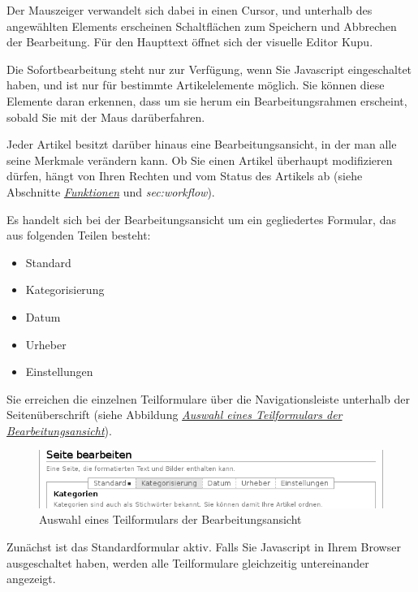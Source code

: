 \documentclass[a4paper,12pt,ngerman]{manual}
\begin{document}
Der Mauszeiger verwandelt sich dabei in einen Cursor, und unterhalb des
angewählten Elements erscheinen Schaltflächen zum Speichern und Abbrechen der
Bearbeitung. Für den Haupttext öffnet sich der visuelle Editor Kupu.

Die Sofortbearbeitung steht nur zur Verfügung, wenn Sie Javascript
eingeschaltet haben, und ist nur für bestimmte
Artikelelemente möglich. Sie können diese Elemente daran erkennen, dass um sie
herum ein Bearbeitungsrahmen erscheint, sobald Sie mit der Maus darüberfahren.

Jeder Artikel besitzt darüber hinaus eine Bearbeitungsansicht, in der man alle
seine Merkmale verändern kann. Ob Sie einen Artikel überhaupt modifizieren
dürfen, hängt von Ihren Rechten und vom Status des Artikels ab (siehe
Abschnitte \hyperlink{sec-benutzer-rollen}{\emph{Funktionen}} und \emph{sec:workflow}).

Es handelt sich bei der Bearbeitungsansicht um ein gegliedertes
Formular, das aus folgenden Teilen besteht:
\begin{itemize}
\item {} 
Standard

\item {} 
Kategorisierung

\item {} 
Datum

\item {} 
Urheber

\item {} 
Einstellungen

\end{itemize}

Sie erreichen die einzelnen Teilformulare über die Navigationsleiste unterhalb
der Seitenüberschrift (siehe Abbildung \hyperlink{fig-bearbeiten-teilformulare}{\emph{Auswahl eines Teilformulars der Bearbeitungsansicht}}).
\hypertarget{fig-bearbeiten-teilformulare}{}\begin{figure}[htbp]
\centering

\includegraphics{bearbeiten-teilformulare.png}
\caption{Auswahl eines Teilformulars der Bearbeitungsansicht}\end{figure}

Zunächst ist das Standardformular aktiv. Falls Sie
Javascript in Ihrem Browser ausgeschaltet haben, werden alle Teilformulare
gleichzeitig untereinander angezeigt.
\end{document}
